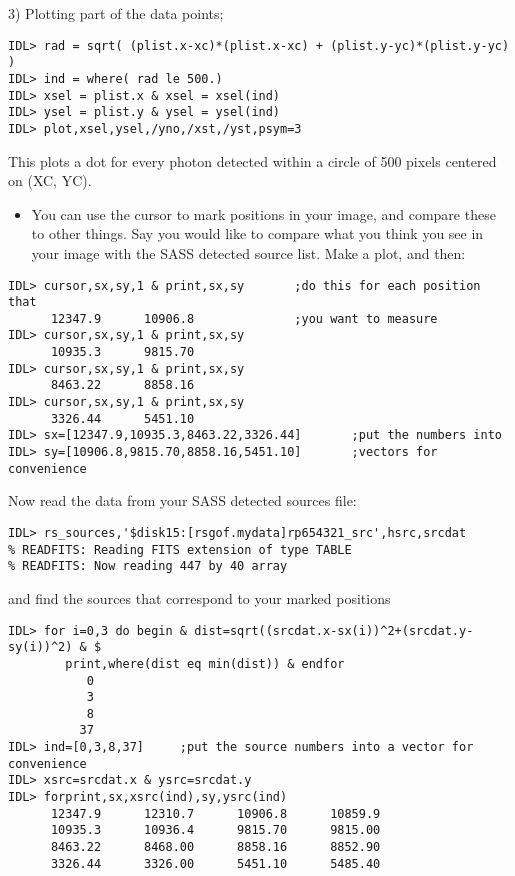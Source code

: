 3) Plotting part of the data points;

\medskip\noindent
\begin{verbatim}
IDL> rad = sqrt( (plist.x-xc)*(plist.x-xc) + (plist.y-yc)*(plist.y-yc) )
IDL> ind = where( rad le 500.)
IDL> xsel = plist.x & xsel = xsel(ind)
IDL> ysel = plist.y & ysel = ysel(ind)
IDL> plot,xsel,ysel,/yno,/xst,/yst,psym=3
\end{verbatim}
This plots a dot for every photon detected within a circle of 500 pixels
centered on (XC, YC).

\begin{itemize}
\item  You can use the cursor to mark positions in your image, and compare these to
other things. Say you would like to compare what you think you see in your
image with the SASS detected source list. Make a plot, and then:
\end{itemize}

\medskip\noindent
\begin{verbatim}
IDL> cursor,sx,sy,1 & print,sx,sy       ;do this for each position that
      12347.9      10906.8              ;you want to measure
IDL> cursor,sx,sy,1 & print,sx,sy
      10935.3      9815.70
IDL> cursor,sx,sy,1 & print,sx,sy
      8463.22      8858.16
IDL> cursor,sx,sy,1 & print,sx,sy
      3326.44      5451.10
IDL> sx=[12347.9,10935.3,8463.22,3326.44]       ;put the numbers into
IDL> sy=[10906.8,9815.70,8858.16,5451.10]       ;vectors for convenience
\end{verbatim}
Now read the data from your SASS detected sources file:

\medskip\noindent
\begin{verbatim}
IDL> rs_sources,'$disk15:[rsgof.mydata]rp654321_src',hsrc,srcdat
% READFITS: Reading FITS extension of type TABLE
% READFITS: Now reading 447 by 40 array
\end{verbatim}
and find the sources that correspond to your marked positions

\medskip\noindent
\begin{verbatim}
IDL> for i=0,3 do begin & dist=sqrt((srcdat.x-sx(i))^2+(srcdat.y-sy(i))^2) & $
        print,where(dist eq min(dist)) & endfor
           0
           3
           8
          37
IDL> ind=[0,3,8,37]     ;put the source numbers into a vector for convenience
IDL> xsrc=srcdat.x & ysrc=srcdat.y
IDL> forprint,sx,xsrc(ind),sy,ysrc(ind)
      12347.9      12310.7      10906.8      10859.9
      10935.3      10936.4      9815.70      9815.00
      8463.22      8468.00      8858.16      8852.90
      3326.44      3326.00      5451.10      5485.40
\end{verbatim}

